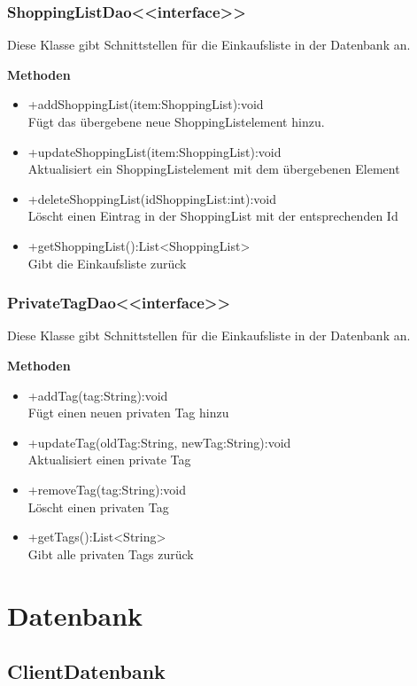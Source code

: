 \subsubsection{ShoppingListDao<<interface>>}
Diese Klasse gibt Schnittstellen für die Einkaufsliste in der Datenbank an.

\textbf{Methoden}
\begin{itemize}
	\item +addShoppingList(item:ShoppingList):void \\Fügt das übergebene neue ShoppingListelement hinzu.
	\item +updateShoppingList(item:ShoppingList):void \\Aktualisiert ein ShoppingListelement mit dem übergebenen Element
	\item +deleteShoppingList(idShoppingList:int):void \\Löscht einen Eintrag in der ShoppingList mit der entsprechenden Id
	\item +getShoppingList():List<ShoppingList> \\Gibt die Einkaufsliste zurück
\end{itemize}

\subsubsection{PrivateTagDao<<interface>>}
Diese Klasse gibt Schnittstellen für die Einkaufsliste in der Datenbank an.

\textbf{Methoden}
\begin{itemize}
	\item +addTag(tag:String):void \\Fügt einen neuen privaten Tag hinzu
	\item +updateTag(oldTag:String, newTag:String):void \\Aktualisiert einen private Tag
	\item +removeTag(tag:String):void \\Löscht einen privaten Tag
	\item +getTags():List<String> \\Gibt alle privaten Tags zurück
\end{itemize}

\section{Datenbank}

\subsection{ClientDatenbank}

